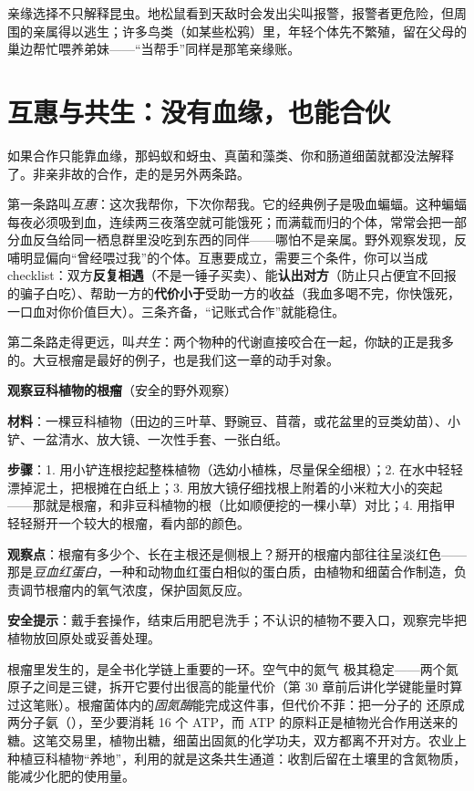 亲缘选择不只解释昆虫。地松鼠看到天敌时会发出尖叫报警，报警者更危险，但周围的亲属得以逃生；许多鸟类（如某些松鸦）里，年轻个体先不繁殖，留在父母的巢边帮忙喂养弟妹——“当帮手”同样是那笔亲缘账。

\section{互惠与共生：没有血缘，也能合伙}

如果合作只能靠血缘，那蚂蚁和蚜虫、真菌和藻类、你和肠道细菌就都没法解释了。非亲非故的合作，走的是另外两条路。

第一条路叫\emph{互惠}：这次我帮你，下次你帮我。它的经典例子是吸血蝙蝠。这种蝙蝠每夜必须吸到血，连续两三夜落空就可能饿死；而满载而归的个体，常常会把一部分血反刍给同一栖息群里没吃到东西的同伴——哪怕不是亲属。野外观察发现，反哺明显偏向“曾经喂过我”的个体。互惠要成立，需要三个条件，你可以当成 checklist：双方\textbf{反复相遇}（不是一锤子买卖）、能\textbf{认出对方}（防止只占便宜不回报的骗子白吃）、帮助一方的\textbf{代价小于}受助一方的收益（我血多喝不完，你快饿死，一口血对你价值巨大）。三条齐备，“记账式合作”就能稳住。

第二条路走得更远，叫\emph{共生}：两个物种的代谢直接咬合在一起，你缺的正是我多的。大豆根瘤是最好的例子，也是我们这一章的动手对象。

\begin{shiyan}
\textbf{观察豆科植物的根瘤}（安全的野外观察）

\textbf{材料}：一棵豆科植物（田边的三叶草、野豌豆、苜蓿，或花盆里的豆类幼苗）、小铲、一盆清水、放大镜、一次性手套、一张白纸。

\textbf{步骤}：1. 用小铲连根挖起整株植物（选幼小植株，尽量保全细根）；2. 在水中轻轻漂掉泥土，把根摊在白纸上；3. 用放大镜仔细找根上附着的小米粒大小的突起——那就是根瘤，和非豆科植物的根（比如顺便挖的一棵小草）对比；4. 用指甲轻轻掰开一个较大的根瘤，看内部的颜色。

\textbf{观察点}：根瘤有多少个、长在主根还是侧根上？掰开的根瘤内部往往呈淡红色——那是\emph{豆血红蛋白}，一种和动物血红蛋白相似的蛋白质，由植物和细菌合作制造，负责调节根瘤内的氧气浓度，保护固氮反应。

\textbf{安全提示}：戴手套操作，结束后用肥皂洗手；不认识的植物不要入口，观察完毕把植物放回原处或妥善处理。
\end{shiyan}

根瘤里发生的，是全书化学链上重要的一环。空气中的氮气  极其稳定——两个氮原子之间是三键，拆开它要付出很高的能量代价（第 30 章前后讲化学键能量时算过这笔账）。根瘤菌体内的\emph{固氮酶}能完成这件事，但代价不菲：把一分子的  还原成两分子氨（），至少要消耗 16 个 ATP，而 ATP 的原料正是植物光合作用送来的糖。这笔交易里，植物出糖，细菌出固氮的化学功夫，双方都离不开对方。农业上种植豆科植物“养地”，利用的就是这条共生通道：收割后留在土壤里的含氮物质，能减少化肥的使用量。

